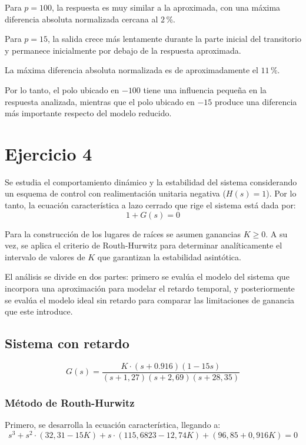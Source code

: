 \documentclass[12pt,a4paper]{article}
\begin{document}
Para $p=100$, la respuesta es muy similar a la aproximada,
con una máxima diferencia absoluta normalizada cercana
al $2\,\%$.

Para $p=15$, la salida crece más lentamente durante
la parte inicial del transitorio y permanece inicialmente
por debajo de la respuesta aproximada.

La máxima diferencia absoluta normalizada es de
aproximadamente el $11\,\%$.

Por lo tanto, el polo ubicado en $-100$ tiene una
influencia pequeña en la respuesta analizada, mientras
que el polo ubicado en $-15$ produce una diferencia
más importante respecto del modelo reducido.

\clearpage

\section*{Ejercicio 4}

Se estudia el comportamiento dinámico y la estabilidad del sistema considerando un esquema de control con realimentación unitaria negativa ($H(s) = 1$). Por lo tanto, la ecuación característica a lazo cerrado que rige el sistema está dada por:
\[ 1 + G(s) = 0 \]

Para la construcción de los lugares de raíces se asumen ganancias $K \ge 0$. A su vez, se aplica el criterio de Routh-Hurwitz para determinar analíticamente el intervalo de valores de $K$ que garantizan la estabilidad asintótica. 

El análisis se divide en dos partes: primero se evalúa el modelo del sistema que incorpora una aproximación para modelar el retardo temporal, y posteriormente se evalúa el modelo ideal sin retardo para comparar las limitaciones de ganancia que este introduce.

\subsection*{Sistema con retardo}

\[
G(s) = \frac{K\cdot (s+0.916)(1-15s)}{(s+1,27)(s+2,69)(s+28,35)}
\]

\subsubsection*{Método de Routh-Hurwitz}

Primero, se desarrolla la ecuación característica, llegando a:
\[
s^3 + s^2 \cdot (32,31-15K) + s\cdot (115,6823-12,74K) + (96,85 + 0,916K) = 0
\]
\end{document}
